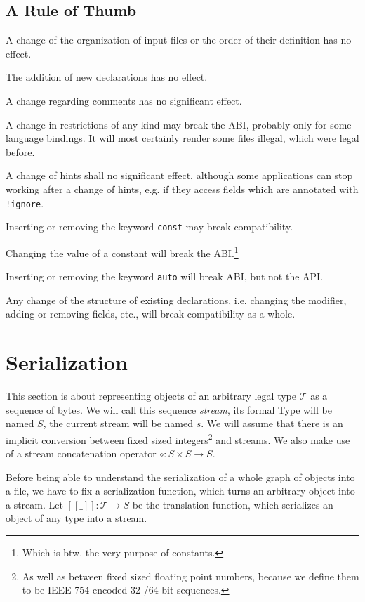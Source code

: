 \documentclass[a4paper,10pt]{article}
\newcommand{\den}[1]{[\![#1]\!]}
\begin{document}
\subsection{A Rule of Thumb}

A change of the organization of input files or the order of their definition has no effect.

The addition of new declarations has no effect.

A change regarding comments has no significant effect.

A change in restrictions of any kind may break the ABI, probably only for some language bindings. It will most certainly render some files illegal, which were legal before.

A change of hints shall no significant effect, although some applications can stop working after a change of hints, e.g. if they access fields which are annotated with \verb/!ignore/.

Inserting or removing the keyword \texttt{const} may break compatibility.

Changing the value of a constant will break the ABI.\footnote{Which is btw. the very purpose of constants.}

Inserting or removing the keyword \texttt{auto} will break ABI, but not the API.

Any change of the structure of existing declarations, i.e. changing the modifier, adding or removing fields, etc., will break compatibility as a whole.

\section{Serialization}

This section is about representing objects of an arbitrary legal type $\mathcal{T}$ as a sequence of bytes. We will call this sequence \textit{stream}, its formal Type will be named $S$, the current stream will be named $s$. We will assume that there is an implicit conversion between fixed sized integers\footnote{As well as between fixed sized floating point numbers, because we define them to be IEEE-754 encoded 32-/64-bit sequences.} and streams. We also make use of a stream concatenation operator $\circ : S \times S → S$.

Before being able to understand the serialization of a whole graph of objects into a file, we have to fix a serialization function, which turns an arbitrary object into a stream. Let $\den{\_}:\mathcal{T} → S$ be the translation function, which serializes an object of any type into a stream.
\end{document}
